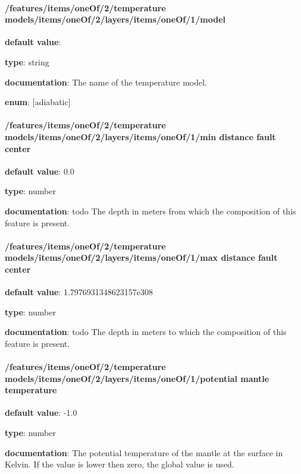 \paragraph{/features/items/oneOf/2/temperature models/items/oneOf/2/layers/items/oneOf/1/model} \begin{itemized}
\item {\bf default value}: 
\item {\bf type}: string
\item {\bf documentation}: The name of the temperature model.
\item {\bf enum}: [adiabatic]\end{itemized}\paragraph{/features/items/oneOf/2/temperature models/items/oneOf/2/layers/items/oneOf/1/min distance fault center} \begin{itemized}
\item {\bf default value}: 0.0
\item {\bf type}: number
\item {\bf documentation}: todo The depth in meters from which the composition of this feature is present.
\end{itemized}\paragraph{/features/items/oneOf/2/temperature models/items/oneOf/2/layers/items/oneOf/1/max distance fault center} \begin{itemized}
\item {\bf default value}: 1.7976931348623157e308
\item {\bf type}: number
\item {\bf documentation}: todo The depth in meters to which the composition of this feature is present.
\end{itemized}\paragraph{/features/items/oneOf/2/temperature models/items/oneOf/2/layers/items/oneOf/1/potential mantle temperature} \begin{itemized}
\item {\bf default value}: -1.0
\item {\bf type}: number
\item {\bf documentation}: The potential temperature of the mantle at the surface in Kelvin. If the value is lower then zero, the global value is used.

\end{itemized}
